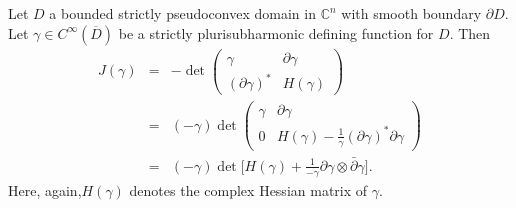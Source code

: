 \documentclass[12pt]{amsart}
\def\d{\partial}
\def\d{\partial}
\begin{document}
Let $D$ a bounded strictly pseudoconvex domain in $\mathbb{C}^n$ with smooth boundary $\d D$.
Let $\gamma\in C^\infty(\overline{D})$ be a strictly  plurisubharmonic  defining function for $D$.
Then
\begin{eqnarray*}
J(\gamma)
&= &-\det
\begin{pmatrix}
\gamma & \partial \gamma \\
(\partial \gamma)^* & H(\gamma)
\end{pmatrix}\\
&=& (-\gamma)\det
\begin{pmatrix}
\gamma & \partial \gamma \\
0 & H(\gamma) - \frac{1}{\gamma}(\partial \gamma)^*\partial \gamma
\end{pmatrix}\\
&=& (-\gamma)\det\Big[ H(\gamma) + \frac{1}{-\gamma}\partial\gamma \otimes \bar\partial\gamma \Big].
\end{eqnarray*}
Here,  again,$H(\gamma)$ denotes the complex Hessian matrix of $\gamma$. 
\end{document}
